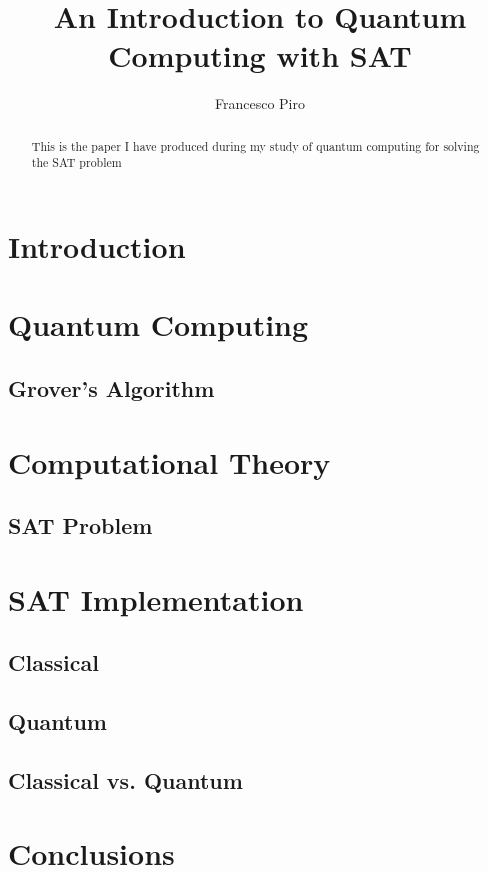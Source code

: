 \documentclass[english]{article}
\begin{document}
	\title{An Introduction to Quantum Computing with SAT}
	\author{Francesco Piro}
	\maketitle
	
	\begin{abstract}
		This is the paper I have produced during my study of quantum computing for solving the SAT problem
	\end{abstract}
	
	\section{Introduction}
	\label{sec:introduction}
	
	\section{Quantum Computing}
	\label{sec:quantumComputing}
		\subsection{Grover's Algorithm}
		\label{sec:grover}
		
	\section{Computational Theory}
	\label{sec:computationalTheory}
		\subsection{SAT Problem}
		\label{sec:sat}
		
	\section{SAT Implementation}
	\label{sec:satImpl}
		\subsection{Classical}
		\label{sec:satClassical}
		
		\subsection{Quantum}
		\label{sec:satQuantum}
		
		\subsection{Classical vs. Quantum}
		\label{sec:satCsatQ}
		
	\section{Conclusions}
	\label{sec:conclusions}
	
	\clearpage
	
	\nocite{*}
	
\end{document}
